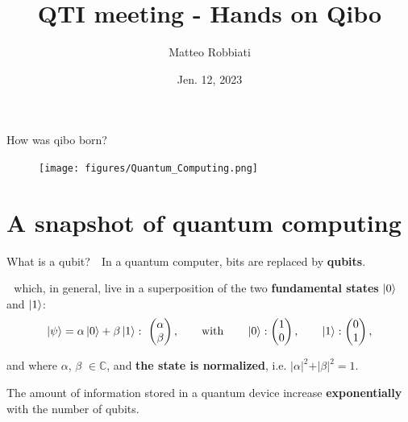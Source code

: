 \documentclass[8pt, xcolor={svgnames}, hyperref={colorlinks,linkcolor=black, citecolor=amethyst, urlcolor=amethyst}]{beamer}
\title{QTI meeting - Hands on Qibo}
\date{Jen. 12, 2023}
\author[Matteo Robbiati]{Matteo Robbiati}
\begin{document}
\maketitle

\begin{frame}{How was qibo born?}
    \begin{figure}  
    \texttt{[image: figures/Quantum\_Computing.png]}
    \end{figure}
    \vspace{-0.5cm}
\end{frame}

\section{A snapshot of quantum computing}

\begin{frame}{What is a qubit?}
\large
\faArrowCircleRight\,\, In a quantum computer, bits are replaced by \textbf{qubits}.
\pause

\faArrowCircleRight\,\, which, in general, live in a superposition of 
the two \textbf{fundamental states} $\ket{0}$ and $\ket{1}$:
\begin{equation*}
    \ket{\psi} = \alpha \ket{0} + \beta \ket{1}: \,\,
    \begin{pmatrix} 
    \alpha \\ 
    \beta 
    \end{pmatrix}, \qquad \text{with} \qquad     
    \ket{0}:
    \begin{pmatrix} 
    1 \\ 
    0  
    \end{pmatrix}, \qquad \ket{1}:
    \begin{pmatrix} 
    0 \\ 
    1 
    \end{pmatrix}, 
\end{equation*}

and where $\alpha$, $\beta$ $\in \mathbb{C}$, and \textbf{the state is normalized}, i.e. $
    \vert \alpha \vert^2 + \vert \beta \vert^2 = 1.
$   
\pause
\vspace{0.8cm}
\begin{tcolorbox}[colback=amethyst!30, title=Storage advantage]
  The amount of information stored in a quantum device increase \textbf{exponentially}
  with the number of qubits.
\end{tcolorbox}
\end{frame}
\end{document}
